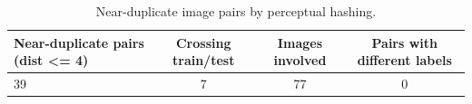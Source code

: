 \begin{table}[t]
\centering
\caption{Near-duplicate image pairs by perceptual hashing.}
\label{tab:dup}
\begin{tabular}{lccc}
\toprule
Near-duplicate pairs (dist <= 4) & Crossing train/test & Images involved & Pairs with different labels \\
\midrule
39 & 7 & 77 & 0 \\
\bottomrule
\end{tabular}
\end{table}